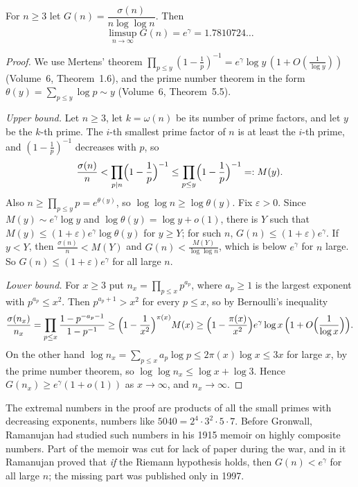 \begin{theorem}[Gronwall, 1913]\label{conjectures:thm:gronwall}
For $n\ge3$ let $G(n)=\dfrac{\sigma(n)}{n\log\log n}$. Then
\[
\limsup_{n\to\infty}G(n)=e^\gamma=1.7810724\ldots
\]
\end{theorem}
\begin{proof}
We use Mertens' theorem $\prod_{p\le y}(1-\frac1p)^{-1}=e^\gamma\log y\,(1+O(\frac1{\log y}))$ (Volume~6, Theorem~1.6), and the prime number theorem in the
form $\theta(y)=\sum_{p\le y}\log p\sim y$ (Volume~6, Theorem~5.5).

\emph{Upper bound.} Let $n\ge3$, let $k=\omega(n)$ be its number of prime factors, and let $y$ be the $k$-th prime. The $i$-th smallest prime factor of $n$
is at least the $i$-th prime, and $(1-\frac1p)^{-1}$ decreases with $p$, so
\[
\frac{\sigma(n)}n<\prod_{p\mid n}\Bigl(1-\frac1p\Bigr)^{-1}\le\prod_{p\le y}\Bigl(1-\frac1p\Bigr)^{-1}=:M(y).
\]
Also $n\ge\prod_{p\le y}p=e^{\theta(y)}$, so $\log\log n\ge\log\theta(y)$. Fix $\varepsilon>0$. Since $M(y)\sim e^\gamma\log y$ and $\log\theta(y)=\log y+o(1)$,
there is $Y$ such that $M(y)\le(1+\varepsilon)e^\gamma\log\theta(y)$ for $y\ge Y$; for such $n$, $G(n)\le(1+\varepsilon)e^\gamma$. If $y<Y$, then
$\frac{\sigma(n)}n<M(Y)$ and $G(n)<\frac{M(Y)}{\log\log n}$, which is below $e^\gamma$ for $n$ large. So $G(n)\le(1+\varepsilon)e^\gamma$ for all large $n$.

\emph{Lower bound.} For $x\ge3$ put $n_x=\prod_{p\le x}p^{a_p}$, where $a_p\ge1$ is the largest exponent with $p^{a_p}\le x^2$. Then $p^{a_p+1}>x^2$ for every
$p\le x$, so by Bernoulli's inequality
\[
\frac{\sigma(n_x)}{n_x}=\prod_{p\le x}\frac{1-p^{-a_p-1}}{1-p^{-1}}\ge\Bigl(1-\frac1{x^2}\Bigr)^{\pi(x)}M(x)\ge\Bigl(1-\frac{\pi(x)}{x^2}\Bigr)e^\gamma\log x\,\Bigl(1+O\Bigl(\frac1{\log x}\Bigr)\Bigr).
\]
On the other hand $\log n_x=\sum_{p\le x}a_p\log p\le2\pi(x)\log x\le3x$ for large $x$, by the prime number theorem, so $\log\log n_x\le\log x+\log3$.
Hence $G(n_x)\ge e^\gamma(1+o(1))$ as $x\to\infty$, and $n_x\to\infty$.
\end{proof}

The extremal numbers in the proof are products of all the small primes with decreasing exponents, numbers like $5040=2^4\cdot3^2\cdot5\cdot7$. Before
Gronwall, Ramanujan had studied such numbers in his 1915 memoir on highly composite numbers. Part of the memoir was cut for lack of paper during the war,
and in it Ramanujan proved that \emph{if} the Riemann hypothesis holds, then $G(n)<e^\gamma$ for all large $n$; the missing part was published only in
1997.

